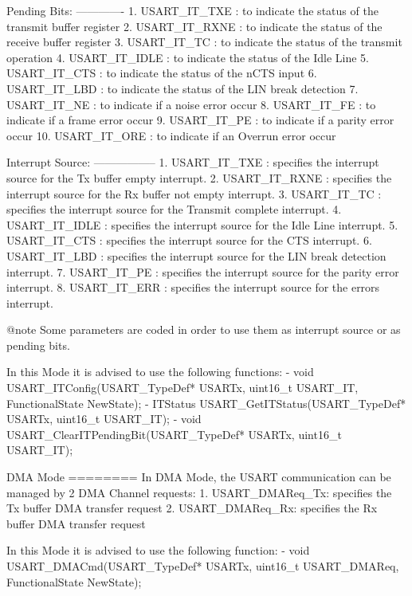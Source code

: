 \begin{DoxyVerb}
  Pending Bits:
  ------------- 
     1. USART_IT_TXE : to indicate the status of the transmit buffer register
     2. USART_IT_RXNE : to indicate the status of the receive buffer register
     3. USART_IT_TC : to indicate the status of the transmit operation
     4. USART_IT_IDLE : to indicate the status of the Idle Line             
     5. USART_IT_CTS : to indicate the status of the nCTS input
     6. USART_IT_LBD : to indicate the status of the LIN break detection
     7. USART_IT_NE : to indicate if a noise error occur
     8. USART_IT_FE : to indicate if a frame error occur
     9. USART_IT_PE : to indicate if a parity error occur
     10. USART_IT_ORE : to indicate if an Overrun error occur

  Interrupt Source:
  -----------------
     1. USART_IT_TXE : specifies the interrupt source for the Tx buffer empty 
                       interrupt. 
     2. USART_IT_RXNE : specifies the interrupt source for the Rx buffer not 
                        empty interrupt.
     3. USART_IT_TC : specifies the interrupt source for the Transmit complete 
                       interrupt. 
     4. USART_IT_IDLE : specifies the interrupt source for the Idle Line interrupt.             
     5. USART_IT_CTS : specifies the interrupt source for the CTS interrupt. 
     6. USART_IT_LBD : specifies the interrupt source for the LIN break detection
                       interrupt. 
     7. USART_IT_PE : specifies the interrupt source for the parity error interrupt. 
     8. USART_IT_ERR :  specifies the interrupt source for the errors interrupt.

@note Some parameters are coded in order to use them as interrupt source or as pending bits.

  In this Mode it is advised to use the following functions:
     - void USART_ITConfig(USART_TypeDef* USARTx, uint16_t USART_IT, FunctionalState NewState);
     - ITStatus USART_GetITStatus(USART_TypeDef* USARTx, uint16_t USART_IT);
     - void USART_ClearITPendingBit(USART_TypeDef* USARTx, uint16_t USART_IT);

  DMA Mode
  ========
  In DMA Mode, the USART communication can be managed by 2 DMA Channel requests:
     1. USART_DMAReq_Tx: specifies the Tx buffer DMA transfer request
     2. USART_DMAReq_Rx: specifies the Rx buffer DMA transfer request

  In this Mode it is advised to use the following function:
     - void USART_DMACmd(USART_TypeDef* USARTx, uint16_t USART_DMAReq, FunctionalState NewState);\end{DoxyVerb}
 

